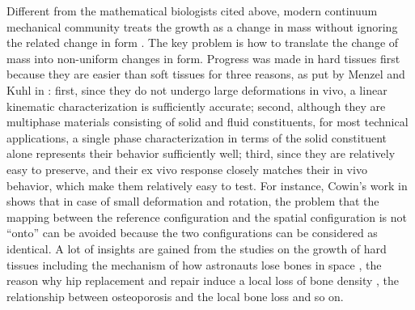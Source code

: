 \documentclass[12pt]{article}
\begin{document}
Different from the mathematical biologists cited above, modern continuum mechanical community treats the growth as a change in mass without ignoring the related change in form \cite{Ambrosi}. The key problem is how to translate the change of mass into non-uniform changes in form. Progress was made in hard tissues first because they are easier than soft tissues for three reasons, as put by Menzel and Kuhl in \cite{Menzel}: first, since they do not undergo large deformations in vivo, a linear kinematic characterization is sufficiently accurate; second, although they are multiphase materials consisting of solid and fluid constituents, for most technical applications, a single phase characterization in terms of the solid constituent alone represents their behavior sufficiently well; third, since they are relatively easy to preserve, and their ex vivo response closely matches their in vivo behavior, which make them relatively easy to test. For instance, Cowin's work in \cite{Cowin} shows that in case of small deformation and rotation, the problem that the mapping between the reference configuration and the spatial configuration is not ``onto'' can be avoided because the two configurations can be considered as identical. A lot of insights are gained from the studies on the growth of hard tissues including the mechanism of how astronauts lose bones in space \cite{Kuhl2}, the reason why hip replacement and repair induce a local loss of bone density \cite{Ambrosi}, the relationship between osteoporosis and the local bone loss \cite{Pang} and so on.
\end{document}
